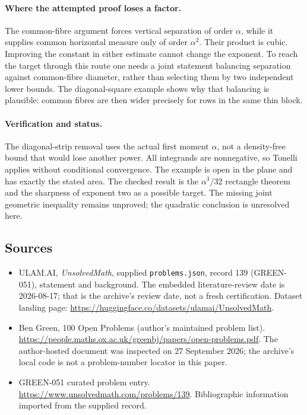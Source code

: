 \documentclass[11pt,a4paper]{article}
\begin{document}
\paragraph{Where the attempted proof loses a factor.}
The common-fibre argument forces vertical separation of order $\alpha$, while it supplies common horizontal measure only of order $\alpha^2$. Their product is cubic. Improving the constant in either estimate cannot change the exponent. To reach the target through this route one needs a joint statement balancing separation against common-fibre diameter, rather than selecting them by two independent lower bounds. The diagonal-square example shows why that balancing is plausible: common fibres are then wider precisely for rows in the same thin block.

\paragraph{Verification and status.}
The diagonal-strip removal uses the actual first moment $\alpha$, not a density-free bound that would lose another power. All integrands are nonnegative, so Tonelli applies without conditional convergence. The example is open in the plane and has exactly the stated area. The checked result is the $\alpha^3/32$ rectangle theorem and the sharpness of exponent two as a possible target. The missing joint geometric inequality remains unproved; the quadratic conclusion is unresolved here.

\subsection{Sources}

{\small

\begin{itemize}

\item[\hypertarget{source:139:1}{S1}] ULAM.AI, \emph{UnsolvedMath}, supplied \texttt{problems.json}, record 139 (GREEN-051), statement and background. The embedded literature-review date is 2026-08-17; that is the archive’s review date, not a fresh certification. Dataset landing page: \url{https://huggingface.co/datasets/ulamai/UnsolvedMath}.

\item[\hypertarget{source:139:2}{S2}] Ben Green, 100 Open Problems (author’s maintained problem list). \url{https://people.maths.ox.ac.uk/greenbj/papers/open-problems.pdf}. The author-hosted document was inspected on 27 September 2026; the archive’s local code is not a problem-number locator in this paper.

\item[\hypertarget{source:139:3}{S3}] GREEN-051 curated problem entry. \url{https://www.unsolvedmath.com/problems/139}. Bibliographic information imported from the supplied record.

\end{itemize}

}

\label{end:139}
\end{document}
